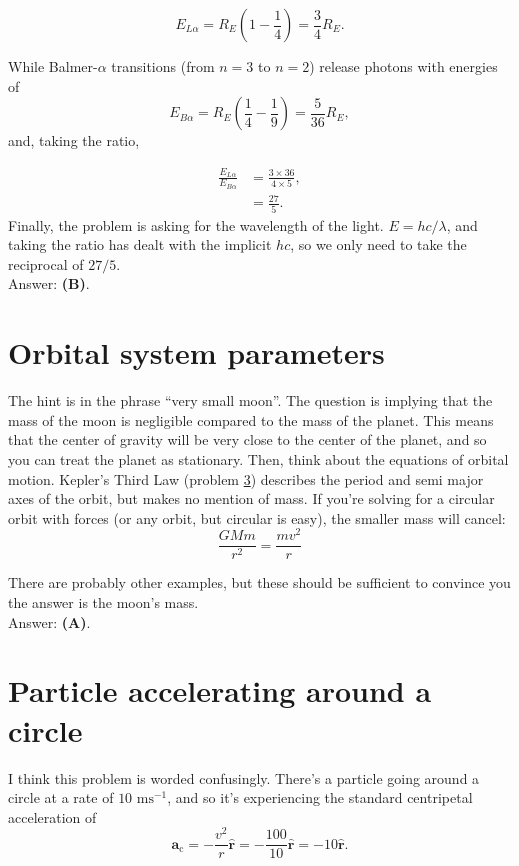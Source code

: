 \documentclass[11pt]{paper}
\newcommand{\answer}[1]{Answer: \textbf{(#1)}.}
\begin{document}
\begin{equation}
E_{L\alpha} = R_E \left(1 - \frac{1}{4}\right) = \frac{3}{4}R_E.
\end{equation}

While Balmer-$\alpha$ transitions (from $n=3$ to $n=2$) release photons with energies of 
\begin{equation}
E_{B\alpha} = R_E \left(\frac{1}{4} - \frac{1}{9}\right) = \frac{5}{36}R_E,
\end{equation}
and, taking the ratio,

\begin{align}
\frac{E_{L\alpha}}{E_{B\alpha}} &= \frac{3 \times 36}{4 \times 5},\\
&= \frac{27}{5}.
\end{align}
Finally, the problem is asking for the wavelength of the light.  $E = hc/\lambda$, and taking the ratio has dealt with the implicit $hc$, so we only need to take the reciprocal of $27/5$.\\

\answer{B}

\section{Orbital system parameters}

The hint is in the phrase ``very small moon''.  The question is implying that the mass of the moon is negligible compared to the mass of the planet.  This means that the center of gravity will be very close to the center of the planet, and so you can treat the planet as stationary.  Then, think about the equations of orbital motion.  Kepler's Third Law (problem \hyperlink{section.3}{3}) describes the period and semi major axes of the orbit, but makes no mention of mass.  If you're solving for a circular orbit with forces (or any orbit, but circular is easy), the smaller mass will cancel:
\begin{equation}
\frac{G M m}{r^2} = \frac{m v^2}{r}
\end{equation}

There are probably other examples, but these should be sufficient to convince you the answer is the moon's mass.\\

\answer{A}

\section{Particle accelerating around a circle}
I think this problem is worded confusingly.  There's a particle going around a circle at a rate of $10\text{ ms}^{-1}$, and so it's experiencing the standard centripetal acceleration of
\begin{equation}
\mathbf{a}_{\text{c}} = - \frac{v^2}{r}\mathbf{\hat{r}} = -\frac{100}{10}\mathbf{\hat{r}} = -10 \mathbf{\hat{r}} .
\end{equation}
\end{document}
